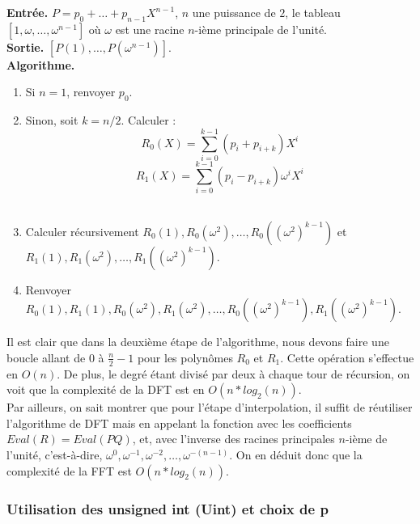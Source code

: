 \documentclass[12pt, a4paper]{article}
\begin{document}
\begin{tcolorbox}[colback=cyan!5!white,
                  colframe=cyan!100!black,
                  title=\textbf{Algorithme DFT}
                 ]
\textbf{Entrée.} $P = p_0+\dots+p_{n-1}X^{n-1}$, $n$ une puissance de $2$, le tableau $[1, \omega,\dots,\omega^{n-1}]$ où $\omega$ est une racine $n$-ième principale de l'unité.\\
\textbf{Sortie.} $[P(1),\dots,P(\omega^{n-1})]$.\\
\textbf{Algorithme.}
\begin{enumerate}[itemsep=-2ex]
\item\textit{}Si $n=1$, renvoyer $p_0$. \\
\item\textit{}Sinon, soit $k=n/2$. Calculer : \\
\[ R_0(X) = \sum_{i=0}^{k-1}(p_i+p_{i+k})X^i \]
\[ R_1(X) = \sum_{i=0}^{k-1}(p_i-p_{i+k})\omega^iX^i \] \\
\item\textit{}Calculer récursivement $R_0(1), R_0(\omega^2),\dots,R_0((\omega^2)^{k-1})$ et \\ $R_1(1), R_1(\omega^2),\dots,R_1((\omega^2)^{k-1})$. \\
\item\textit{}Renvoyer $R_0(1), R_1(1), R_0(\omega^2), R_1(\omega^2),\dots, R_0((\omega^2)^{k-1}), R_1((\omega^2)^{k-1})$.
\end{enumerate}
\end{tcolorbox}

Il est clair que dans la deuxième étape de l'algorithme, nous devons faire une boucle allant de 0 à $\frac{n}{2}-1$ pour les polynômes $R_0$ et $R_1$. Cette opération s'effectue en $O(n)$. De plus, le degré étant divisé par deux à chaque tour de récursion, on voit que la complexité de la DFT est en $O(n*log_2(n))$. \\
Par ailleurs, on sait montrer que pour l'étape d'interpolation, il suffit de réutiliser l'algorithme de DFT mais en appelant la fonction avec les coefficients $Eval(R)=Eval(PQ)$, et, avec l'inverse des racines principales $n$-ième de l'unité, c'est-à-dire, $\omega^{0},\omega^{-1},\omega^{-2},\dots,\omega^{-(n-1)}$.
On en déduit donc que la complexité de la FFT est $O(n*log_2(n))$.

\subsubsection{Utilisation des unsigned int (Uint) et choix de p}
\end{document}
